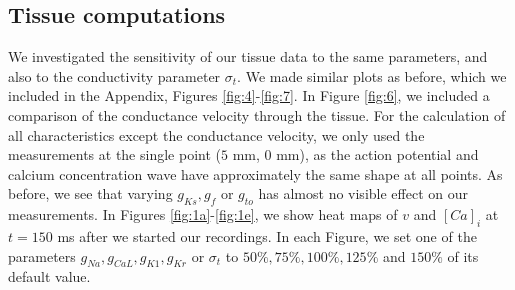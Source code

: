 \documentclass{article}
\begin{document}
\subsection{Tissue computations} \label{Tissue computations}
We investigated the sensitivity of our tissue data to the same parameters, and also to the conductivity parameter $\sigma_t$. We made similar plots as before, which we included in the Appendix, Figures \ref{fig:4}-\ref{fig:7}. In Figure \ref{fig:6}, we included a comparison of the conductance velocity through the tissue. For the calculation of all characteristics except the conductance velocity, we only used the measurements at the single point ($5$ mm, $0$ mm), as the action potential and calcium concentration wave have approximately the same shape at all points. As before, we see that varying $g_{Ks}, g_{f}$ or $g_{to}$ has almost no visible effect on our measurements.  In Figures  \ref{fig:1a}-\ref{fig:1e}, we show heat maps of $v$ and $[Ca]_i$ at $t=150$ ms after we started our recordings. In each Figure, we set one of the parameters $g_{Na}, g_{CaL}, g_{K1}, g_{Kr}$ or $\sigma_t$ to $50\%, 75\%, 100\%, 125\%$ and $150\%$ of its default value.
%
\end{document}
